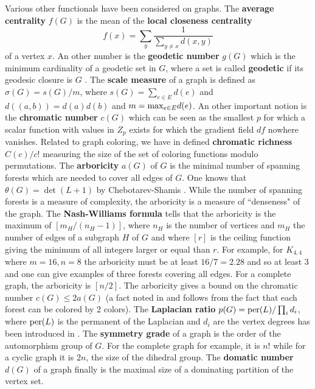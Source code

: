 \documentclass[12pt]{amsart}
\theoremstyle{definition}
\begin{document}
Various other functionals have been considered on graphs. The {\bf average centrality} $f(G)$
is the mean of the {\bf local closeness centrality}
$$ f(x) = \sum_{y} \frac{1}{\sum_{y \neq x} d(x,y)} $$
of a vertex $x$. An other number is the {\bf geodetic number} $g(G)$ which is the minimum
cardinality of a geodetic set in $G$, where a set is called {\bf geodetic} if its geodesic closure
is $G$ \cite{BKT}. The {\bf scale measure} of a graph is defined as $\sigma(G) = s(G)/m$, where 
$s(G) = \sum_{e \in E} d(e)$ and $d((a,b)) = d(a) d(b)$ and $m={\rm max}_{e \in E} d(e)$.  
An other important notion is the {\bf chromatic number} $c(G)$ which can be seen as the smallest
$p$ for which a scalar function with values in $Z_p$ exists for which the gradient 
field $df$ nowhere vanishes. Related to graph coloring, we have in \cite{colorcurvature} defined 
{\bf chromatic richness} $C(c)/c!$ measuring the size of the set of coloring functions modulo permutations.
The {\bf arboricity} $a(G)$ of $G$ is the minimal number of spanning forests 
which are needed to cover all edges of $G$. One knows that $\theta(G) = \det(L+1)$ by 
Chebotarev-Shamis \cite{ChebotarevShamis2,ChebotarevShamis1,Knillforest,CauchyBinetKnill}.
While the number of spanning forests is a measure of complexity, the arboricity is a measure of 
``denseness" of the graph. The {\bf Nash-Williams formula} \cite{NashWilliams,CMWZZ} 
tells that the arboricity is the maximum of $[m_H/(n_H-1)]$, where $n_H$
is the number of vertices and $m_H$ the number of edges of a subgraph $H$ of $G$ and where $[r]$ is
the ceiling function giving the minimum of all integers larger or equal than $r$. For example, 
for $K_{4,4}$ where $m=16, n=8$ the arboricity must be at least $16/7=2.28$ and so at least $3$ 
and one can give examples of three forests covering all edges. 
For a complete graph, the arboricity is $[n/2]$. The arboricity gives a bound on 
the chromatic number $c(G) \leq 2 a(G)$ (a fact noted in \cite{ButlerArboricity} and follows 
from the fact that each forest can be colored by 2 colors). 
The {\bf Laplacian ratio} $p(G) = {\rm per}(L)/\prod_i d_i$, 
where ${\rm per}(L)$ is the 
permanent of the Laplacian and $d_i$ are the vertex degrees has been introduced in \cite{BrualdiGoldwasser}.
The {\bf symmetry grade} of a graph is the order of the automorphism group of $G$. For the complete graph 
for example, it is $n!$ while for a cyclic graph it is $2n$, the size of the dihedral group. 
The {\bf domatic number} $d(G)$ of a graph finally is the maximal size of a dominating partition of 
the vertex set.  \\
\end{document}
